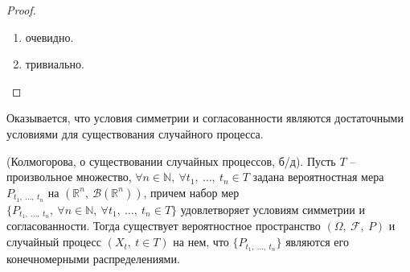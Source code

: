 \begin{proof} ~
\begin{enumerate}
    \item очевидно.
    \item тривиально.
\end{enumerate}
\end{proof}
\begin{note}
Оказывается, что условия симметрии и согласованности являются достаточными условиями для существования случайного процесса.
\end{note}
\begin{theorem}
(Колмогорова, о существовании случайных процессов, б/д). Пусть $\displaystyle T$ -- произвольное множество, $\displaystyle \forall n\in \mathbb{N} ,\ \forall t_{1} ,\ \dotsc ,\ t_{n} \in T$ задана вероятностная мера $\displaystyle P_{t_{1} ,\ \dotsc ,\ t_{n}}$ на $\displaystyle \left(\mathbb{R}^{n} ,\ \mathcal{B}\left(\mathbb{R}^{n}\right)\right)$, причем набор мер $\displaystyle \{P_{t_{1} ,\ \dotsc ,\ t_{n}} ,\ \forall n\in \mathbb{N} ,\ \forall t_{1} ,\ \dotsc ,\ t_{n} \in T\}$ удовлетворяет условиям симметрии и согласованности. Тогда существует вероятностное пространство $\displaystyle ( \Omega ,\ \mathcal{F} ,\ P)$ и случайный процесс $\displaystyle ( X_{t} ,\ t\in T)$ на нем, что $\displaystyle \{P_{t_{1} ,\ \dotsc ,\ t_{n}}\}$ являются его конечномерными распределениями.
\end{theorem}